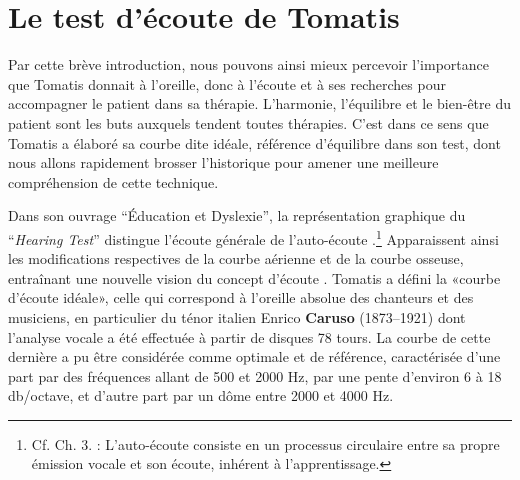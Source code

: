 
\section{Le test d'écoute de Tomatis}
Par cette brève introduction, nous pouvons ainsi mieux percevoir l'importance que Tomatis donnait à l'oreille, donc à l'écoute et à ses recherches pour accompagner le patient dans sa thérapie.
L'harmonie, l'équilibre et le bien-être du patient sont les buts auxquels tendent  toutes thérapies. C'est 
dans ce sens que Tomatis a élaboré sa courbe dite idéale, référence d'équilibre dans son test, dont nous 
allons rapidement brosser l'historique pour amener une meilleure compréhension de cette technique.


Dans son ouvrage ``Éducation et
    Dyslexie''\autocite{tomatis:education}, la représentation graphique du
 ``\emph{Hearing Test}'' distingue l'écoute générale de
 l'auto-écoute \autocite{Tomatislangage}.\footnote{Cf. Ch. 3. : L'auto-écoute consiste en un processus
   circulaire entre sa propre  émission vocale et son écoute, inhérent
   à l'apprentissage. }
 Apparaissent ainsi les modifications respectives
 de la courbe aérienne et de la courbe osseuse, entraînant une nouvelle vision
 du concept d'écoute \autocite{tomatis_conf}.%
 Tomatis a défini la «courbe d'écoute idéale», celle qui correspond à l'oreille absolue
des chanteurs et des musiciens, en particulier du ténor italien Enrico
\textbf{Caruso} (1873--1921) dont l'analyse vocale a été effectuée à partir de
disques 78 tours. La courbe de cette dernière a pu être considérée comme
optimale et de référence, caractérisée d'une part par des fréquences allant de 500 et 2000
Hz, par une pente d\textquoteright environ 6 à 18 db/octave,
et d'autre part par un dôme entre 2000 et 4000 Hz.

